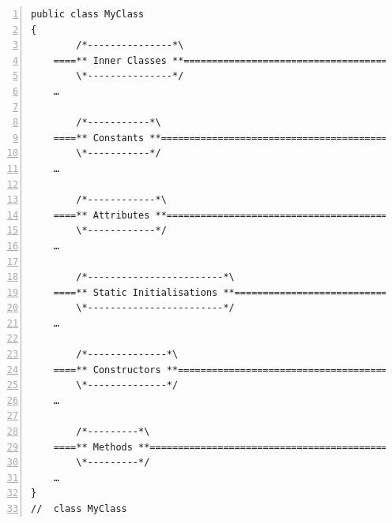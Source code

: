 \documentclass[11pt,a4paper, titlepage, parskip=half, headsepline, footsepline, cleardoublepage=current, headheight=1cm]{scrbook}
\begin{document}
\begin{lstlisting}[numbers=left,caption={Class Skeleton}]
public class MyClass 
{
        /*---------------*\
    ====** Inner Classes **==========================================
        \*---------------*/
    …    
        
        /*-----------*\
    ====** Constants **==============================================
        \*-----------*/
    …
        
        /*------------*\
    ====** Attributes **=============================================
        \*------------*/
    …
            
        /*------------------------*\
    ====** Static Initialisations **=================================
        \*------------------------*/
    …
        
        /*--------------*\
    ====** Constructors **===========================================
        \*--------------*/
    …
        
        /*---------*\
    ====** Methods **================================================
        \*---------*/
    …            
}
//  class MyClass
\end{lstlisting}
 
\end{document}
